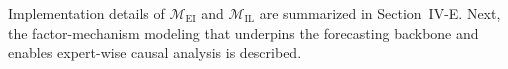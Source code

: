 ﻿\documentclass[journal]{IEEEtran}
\begin{document}
Implementation details of $\mathcal{M}_{\mathrm{EI}}$ and $\mathcal{M}_{\mathrm{IL}}$ are summarized in Section~IV-E. Next, the factor-mechanism modeling that underpins the forecasting backbone and enables expert-wise causal analysis is described.

\end{document}
